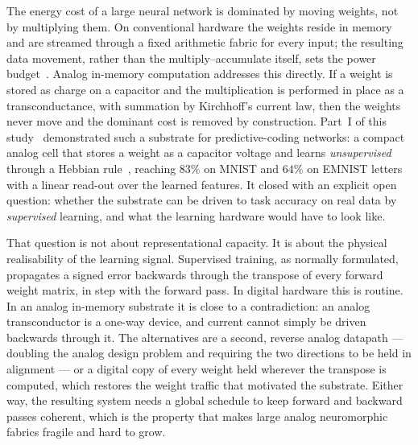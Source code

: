 \documentclass[11pt]{article}
\begin{document}
The energy cost of a large neural network is dominated by moving weights, not by multiplying them.
On conventional hardware the weights reside in memory and are streamed through a fixed arithmetic
fabric for every input; the resulting data movement, rather than the multiply--accumulate itself,
sets the power budget~\cite{mead1989analog,ambrogio2018equivalent}. Analog in-memory computation
addresses this directly. If a weight is stored as charge on a capacitor and the multiplication is
performed in place as a transconductance, with summation by Kirchhoff's current law, then the
weights never move and the dominant cost is removed by construction. Part~I of this
study~\cite{dobney2026analog} demonstrated such a substrate for predictive-coding networks: a
compact analog cell that stores a weight as a capacitor voltage and learns \emph{unsupervised}
through a Hebbian rule~\cite{Sanger1989}, reaching $83\%$ on MNIST and $64\%$ on EMNIST letters with
a linear read-out over the learned features. It closed with an explicit open question: whether the
substrate can be driven to task accuracy on real data by \emph{supervised} learning, and what the
learning hardware would have to look like.

That question is not about representational capacity. It is about the physical realisability of the
learning signal. Supervised training, as normally formulated, propagates a signed error backwards
through the transpose of every forward weight matrix, in step with the forward pass. In digital
hardware this is routine. In an analog in-memory substrate it is close to a contradiction: an analog
transconductor is a one-way device, and current cannot simply be driven backwards through it. The
alternatives are a second, reverse analog datapath --- doubling the analog design problem and
requiring the two directions to be held in alignment --- or a digital copy of every weight held
wherever the transpose is computed, which restores the weight traffic that motivated the substrate.
Either way, the resulting system needs a global schedule to keep forward and backward passes
coherent, which is the property that makes large analog neuromorphic fabrics fragile and hard to
grow.
\end{document}
